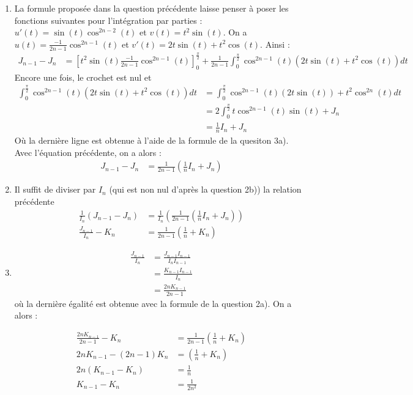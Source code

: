 \begin{correction}
\begin{enumerate}
\begin{enumerate}
\item La formule proposée dans la question précédente laisse penser à poser les fonctions suivantes pour l'intégration par parties :  
 $u'(t)= \sin(t)\cos^{2n-2}(t) $ et $v(t) =t^2\sin(t)$. On a $u(t)= \frac{-1}{2n-1}\cos^{2n-1}(t)$ et $v'(t) =2t\sin(t) +t^2 \cos(t)$. Ainsi :
 \begin{align*}
 J_{n-1}-J_n&= \left[ t^2  \sin(t) \frac{-1}{2n-1}\cos^{2n-1}(t)\right]_0^{\frac{\pi}{2}}   + \frac{1}{2n-1} \int_0^{\frac{\pi}{2}} \cos^{2n-1}(t)(2t\sin(t) +t^2 \cos(t))dt
 \end{align*}
Encore une fois, le crochet est nul et 
\begin{align*}
\int_0^{\frac{\pi}{2}} \cos^{2n-1}(t)(2t\sin(t) +t^2 \cos(t))dt &= \int_0^{\frac{\pi}{2}} \cos^{2n-1}(t)(2t\sin(t)) +t^2 \cos^{2n}(t)dt\\
&=2 \int_0^{\frac{\pi}{2}} t\cos^{2n-1}(t)\sin(t) +J_n\\
&= \frac{1}{n}I_n +J_n
\end{align*}
Où la dernière ligne est obtenue à l'aide de la formule de la quesiton 3a). 
Avec l'équation précédente, on a alors : 
\begin{align*}
J_{n-1} -J_n &= \frac{1}{2n-1} \left(  \frac{1}{n}I_n +J_n \right)
\end{align*}
\item 
Il suffit de diviser par $I_n$ (qui est non nul d'après la question 2b)) la relation précédente   
\begin{align*}
\frac{1}{I_n}(J_{n-1} -J_n) &= \frac{1}{I_n} \left(\frac{1}{2n-1} \left(  \frac{1}{n}I_n +J_n \right)\right)\\
\frac{J_{n-1}}{I_n} -K_n &=  \frac{1}{2n-1} \left(  \frac{1}{n} +K_n \right)
\end{align*}
\item 
\begin{align*}
\frac{J_{n-1}}{I_n} &= \frac{J_{n-1} I_{n-1}}{I_n I_{n-1}} \\
							&= \frac{K_{n-1} I_{n-1}}{I_n } \\	
							&= \frac{2n K_{n-1}}{2n-1 } 
\end{align*}
où la dernière égalité est obtenue avec la formule de la question 2a). On  a alors : 

\begin{align*}
\frac{2n K_{n-1} }{2n-1 }  - K_n &= \frac{1}{2n-1} \left(  \frac{1}{n} +K_n \right)\\
2n K_{n-1}  - (2n-1) K_n &=  \left(  \frac{1}{n} +K_n \right)\\
 2n(K_{n-1} -K_n) &= \frac{1}{n}\\
 K_{n-1}- K_n &= \frac{1}{2n^2}
\end{align*}





\end{enumerate}
\end{enumerate}
\end{correction}
